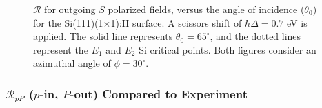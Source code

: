 \begin{figure}[H]
\centering
{}\hfill
{}
\caption[Overview of the angular dependence of $\mathcal{R}_{\mathrm{iS}}$.]
{$\mathcal{R}$ for outgoing $S$ polarized fields, versus the angle of
incidence ($\theta_{0}$) for the Si(111)(1$\times$1):H surface. A scissors shift
of $\hbar\Delta = 0.7$ eV is applied. The solid line represents $\theta_{0} =
65^{\circ}$, and the dotted lines represent the $E_{1}$ and $E_{2}$ Si critical
points. Both figures consider an azimuthal angle of $\phi = 30^{\circ}$.}
\label{fig:1x1rS3d}
\end{figure}



\subsubsection{\texorpdfstring{$\mathcal{R}_{pP}$}{RpP} ($p$-in, $P$-out)
Compared to Experiment}
\label{sec:1x1RpP}

